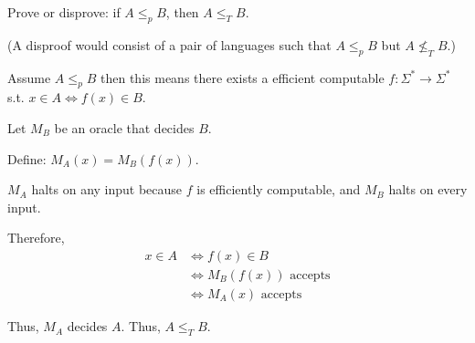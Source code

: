 \documentclass[12pt, letterpaper]{article}
\renewcommand{\t}[1]{\text{#1}}
\begin{document}
\begin{subproblem}{}
    Prove or disprove: if $A \leq_p B$, then $A \leq_T B$.

   (A disproof would consist of a pair of languages such that $A \leq_p B$ but $A \not \leq_T B$.)
\end{subproblem}
\begin{problemproof}
    Assume $A \leq_p B$ then this means there exists a efficient computable $f : \Sigma^* \to \Sigma^*$ s.t. $x \in A \iff f(x) \in B$.

    Let $M_B$ be an oracle that decides $B$.

    Define: $M_A(x)=M_B(f(x))$.

    $M_A$ halts on any input because $f$ is efficiently computable, and $M_B$ halts on every input.    
    
    Therefore,
    \begin{align*}
        x \in A &\iff f(x) \in B \\
                &\iff M_B(f(x)) \t{ accepts}\\
                &\iff M_A(x) \t{ accepts}
    \end{align*}

    Thus, $M_A$ decides $A$. Thus, $A \leq_T B$.
\end{problemproof}
\end{document}
